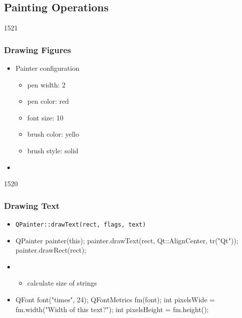 %
%
%
%

\subsection{Painting Operations}

\begin{slide}{1521}\frametitle{Drawing Figures}
\begin{itemize}
\item Painter configuration
  \begin{itemize}
  \item pen width: 2
  \item pen color: red
  \item font size: 10
  \item brush color: yello
  \item brush style: solid
  \end{itemize}

\item {}
\end{itemize}
\end{slide}                             


\begin{slide}[fragile]{1520}\frametitle{Drawing Text}
  \begin{itemize}
  \item \texttt{QPainter::drawText(rect, flags, text)}
  \item[] \begin{cpp}
QPainter painter(this);
painter.drawText(rect, Qt::AlignCenter, tr("Qt"));
painter.drawRect(rect);      
    \end{cpp}
 \item {}
      \begin{itemize}
      \item calculate size of strings
      \end{itemize}
    \item[] \begin{cpp}
QFont font("times", 24);
QFontMetrics fm(font);
int pixelsWide = fm.width("Width of this text?");
int pixelsHeight = fm.height();        
      \end{cpp}
  \end{itemize}
\end{slide}

